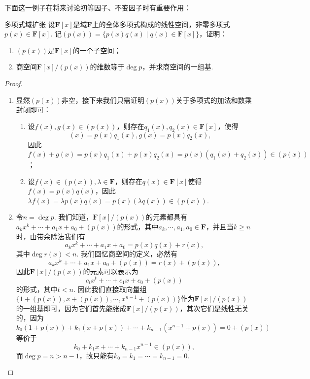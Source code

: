 下面这一例子在将来讨论初等因子、不变因子时有重要作用：
\begin{example}{}{多项式域扩张}
    设$\mathbf{F}[x]$是域$\mathbf{F}$上的全体多项式构成的线性空间，非零多项式$p(x)\in \mathbf{F}[x]$. 记$(p(x))=\{p(x)q(x)\mid q(x)\in \mathbf{F}[x]\}$，证明：
    \begin{enumerate}
        \item $(p(x))$是$\mathbf{F}[x]$的一个子空间；
        \item 商空间$\mathbf{F}[x]/(p(x))$的维数等于$\deg p$，并求商空间的一组基.
    \end{enumerate}
\end{example}
\begin{proof}
    \begin{enumerate}
        \item 显然$(p(x))$非空，接下来我们只需证明$(p(x))$关于多项式的加法和数乘封闭即可：
              \begin{enumerate}
                  \item 设$f(x),g(x)\in(p(x))$，则存在$q_1(x),q_2(x)\in\mathbf{F}[x]$，使得
                        \[(x)=p(x)q_1(x),g(x)=p(x)q_2(x),\]
                        因此$f(x)+g(x)=p(x)q_1(x)+p(x)q_2(x)=p(x)(q_1(x)+q_2(x))\in(p(x))$；
                  \item 设$f(x)\in(p(x)),\lambda\in\mathbf{F}$，则存在$q(x)\in\mathbf{F}[x]$使得$f(x)=p(x)q(x)$，因此$\lambda f(x)=\lambda p(x)q(x)=p(x)(\lambda q(x))\in(p(x))$.
              \end{enumerate}
        \item 令$n=\deg p$. 我们知道，$\mathbf{F}[x]/(p(x))$的元素都具有$a_kx^k+\cdots+a_1x+a_0+(p(x))$的形式，其中$a_k,\cdots,a_1,a_0\in\mathbf{F}$，并且当$k\geqslant n$时，由带余除法我们有
              \[a_kx^k+\cdots+a_1x+a_0=p(x)q(x)+r(x),\]
              其中$\deg r(x)<n$. 我们回忆商空间的定义，必然有
              \[a_kx^k+\cdots+a_1x+a_0+(p(x))=r(x)+(p(x)),\]
              因此$\mathbf{F}[x]/(p(x))$的元素可以表示为
              \[c_tx^t+\cdots+c_1x+c_0+(p(x))\]
              的形式，其中$t<n$. 因此我们直接取向量组$\{1+(p(x)),x+(p(x)),\cdots,x^{n-1}+(p(x))\}$作为$\mathbf{F}[x]/(p(x))$的一组基即可，因为它们首先能张成$\mathbf{F}[x]/(p(x))$，其次它们是线性无关的，因为
              \[k_0(1+p(x))+k_1(x+p(x))+\cdots+k_{n-1}(x^{n-1}+p(x))=0+(p(x))\]
              等价于
              \[k_0+k_1x+\cdots+k_{n-1}x^{n-1}\in(p(x)),\]
              而$\deg p=n>n-1$，故只能有$k_0=k_1=\cdots=k_{n-1}=0$.
    \end{enumerate}
\end{proof}

